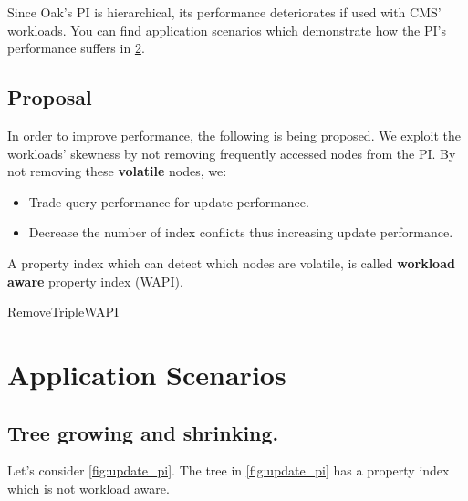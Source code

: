 \documentclass[abstracton,12pt]{scrreprt}
\begin{document}
Since Oak's PI is hierarchical, its performance deteriorates if used with CMS' workloads.
You can find application scenarios which demonstrate how the PI's performance suffers in \cref{sec:application_scenarios}.

\section{Proposal}

In order to improve performance, the following is being proposed.
We exploit the workloads' skewness by not removing frequently accessed nodes from the PI.
By not removing these \textbf{volatile} nodes, we:
\begin{itemize}
    \item Trade query performance for update performance.
    \item Decrease the number of index conflicts thus increasing update performance.
\end{itemize}
A property index which can detect which nodes are volatile, is called \textbf{workload aware} property index (WAPI).


\begin{algorithm}[H]
    \label{algo:remove_triple_wapi}
    \caption{RemoveTripleWAPI}
    \DontPrintSemicolon
    \begin{scriptsize}
    \end{scriptsize}
\end{algorithm}

\chapter{Application Scenarios}
\label{sec:application_scenarios}
\section{Tree growing and shrinking.}

Let's consider \cref{fig:update_pi}.
The tree in \cref{fig:update_pi} has a property index which is not workload aware.
\end{document}
